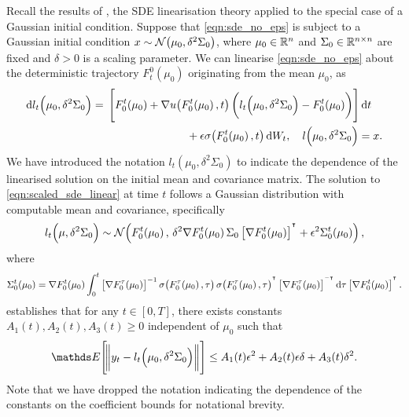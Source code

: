 Recall the results of , the SDE linearisation theory applied to the special case of a Gaussian initial condition.
Suppose that \cref{eqn:sde_no_eps} is subject to a Gaussian initial condition \(x \sim\mathcal{N}\!\left(\mu_0, \delta^2\Sigma_0\right)\), where \(\mu_0 \in \mathbb{R}^n\) and \(\Sigma_0 \in \mathbb{R}^{n\times n}\) are fixed and \(\delta > 0\) is a scaling parameter.
We can linearise \cref{eqn:sde_no_eps} about the deterministic trajectory \(F_t^0\!\left(\mu_0\right)\) originating from the mean \(\mu_0\), as
\begin{equation}
	\dif l_t\!\left(\mu_0, \delta^2\Sigma_0\right) = \begin{multlined}[t]
		\left[F_0^t\!\left(\mu_0\right) + \nabla u\!\left(F_0^t\!\left(\mu_0\right), t\right)\left(l_t\!\left(\mu_0, \delta^2 \Sigma_0\right) - F_0^t\!\left(\mu_0\right)\right)\right]\dif t \\
		+ \epsilon\sigma\!\left(F_0^t\!\left(\mu_0\right), t\right)\dif W_t, \quad l\!\left(\mu_0, \delta^2\Sigma_0\right) = x.
	\end{multlined}
	\label{eqn:scaled_sde_linear}
\end{equation}
We have introduced the notation \(l_t\!\left(\mu_0, \delta^2\Sigma_0\right)\) to indicate the dependence of the linearised solution on the initial mean and covariance matrix.
The solution to \cref{eqn:scaled_sde_linear} at time \(t\) follows a Gaussian distribution with computable mean and covariance, specifically
\[
	l_t\!\left(\mu, \delta^2\Sigma_0\right) \sim\mathcal{N}\!\left(F_0^t\!\left(\mu_0\right), \, \delta^2 \nabla F_0^t\!\left(\mu_0\right) \Sigma_0 \left[\nabla F_0^t\!\left(\mu_0\right)\right]^{^{\intercal}} + \epsilon^2\Sigma_0^t\!\left(\mu_0\right)\right),
\]
where
\[
	\Sigma_0^t\!\left(\mu_0\right) = \nabla F_0^t\!\left(\mu_0\right)\int_0^t{\left[\nabla F_0^\tau\!\left(\mu_0\right)\right]^{-1} \sigma\!\left(F_0^\tau\!\left(\mu_0\right), \tau\right)\sigma\!\left(F_0^\tau\!\left(\mu_0\right), \tau\right)^{\T}\left[\nabla F_0^\tau\!\left(\mu_0\right)\right]^{^{-\intercal}}\dif\tau}\left[\nabla F_0^t\!\left(\mu_0\right)\right]^{\T}.
\]
 establishes that for any \(t \in [0,T]\), there exists constants \(A_1(t), A_2(t), A_3(t) \geq 0\) independent of \(\mu_0\) such that
\begin{equation}\label{eqn:linear_error_bound}
	\avg{\norm{y_t - l_t\!\left(\mu_0, \delta^2 \Sigma_0\right)}} \leq A_1(t)\epsilon^2 + A_2(t)\epsilon\delta + A_3(t)\delta^2.
\end{equation}
Note that we have dropped the notation indicating the dependence of the constants on the coefficient bounds for notational brevity.
